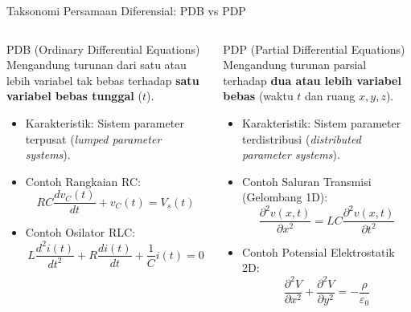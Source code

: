 \documentclass[aspectratio=169,10pt]{beamer}
\begin{document}
\begin{frame}{Taksonomi Persamaan Diferensial: PDB vs PDP}
  \begin{columns}[t]
    \begin{block}{PDB (Ordinary Differential Equations)}
      Mengandung turunan dari satu atau lebih variabel tak bebas terhadap \textbf{satu variabel bebas tunggal} ($t$).
      \vspace{0.1cm}
      \begin{itemize}
        \item Karakteristik: Sistem parameter terpusat (\textit{lumped parameter systems}).
        \item Contoh Rangkaian RC:
        \begin{equation*}
          R C \frac{dv_C(t)}{dt} + v_C(t) = V_s(t)
        \end{equation*}
        \item Contoh Osilator RLC:
        \begin{equation*}
          L \frac{d^2 i(t)}{dt^2} + R \frac{di(t)}{dt} + \frac{1}{C} i(t) = 0
        \end{equation*}
      \end{itemize}
    \end{block}

    \begin{exampleblock}{PDP (Partial Differential Equations)}
      Mengandung turunan parsial terhadap \textbf{dua atau lebih variabel bebas} (waktu $t$ dan ruang $x,y,z$).
      \vspace{0.1cm}
      \begin{itemize}
        \item Karakteristik: Sistem parameter terdistribusi (\textit{distributed parameter systems}).
        \item Contoh Saluran Transmisi (Gelombang 1D):
        \begin{equation*}
          \frac{\partial^2 v(x,t)}{\partial x^2} = L C \frac{\partial^2 v(x,t)}{\partial t^2}
        \end{equation*}
        \item Contoh Potensial Elektrostatik 2D:
        \begin{equation*}
          \frac{\partial^2 V}{\partial x^2} + \frac{\partial^2 V}{\partial y^2} = -\frac{\rho}{\varepsilon_0}
        \end{equation*}
      \end{itemize}
    \end{exampleblock}
  \end{columns}
\end{frame}
\end{document}
